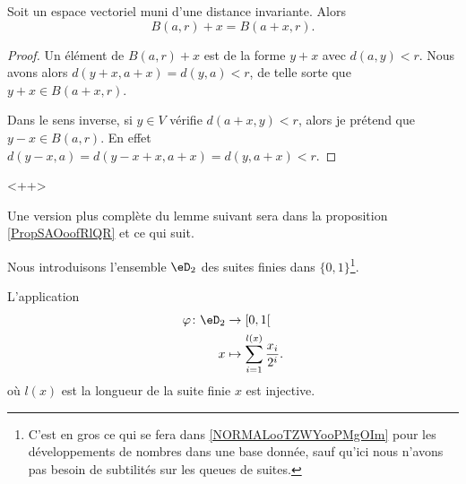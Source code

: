 \begin{lemma}        \label{LEMooZNBAooOhEwJd}
	Soit un espace vectoriel muni d'une distance invariante. Alors
	\begin{equation}
		B(a,r)+x=B(a+x,r).
	\end{equation}
\end{lemma}

\begin{proof}
	Un élément de \( B(a,r)+x\) est de la forme \( y+x\) avec \( d(a,y)<r\). Nous avons alors \( d(y+x,a+x)=d(y,a)<r\), de telle sorte que \( y+x\in B(a+x,r)\).

	Dans le sens inverse, si \( y\in V\) vérifie \( d(a+x,y)<r\), alors je prétend que \( y-x\in B(a,r)\). En effet \( d(y-x,a)=d(y-x+x,a+x)=d(y,a+x)<r\).
\end{proof}
<++>

Une version plus complète du lemme suivant sera dans la proposition \ref{PropSAOoofRlQR} et ce qui suit.
\begin{lemma}      \label{LEMooIQBXooUEtdoy}
	Nous introduisons l'ensemble \( \eD_2\) des suites finies dans \( \{ 0,1 \}\)\footnote{C'est en gros ce qui se fera dans \ref{NORMALooTZWYooPMgOIm} pour les développements de nombres dans une base donnée, sauf qu'ici nous n'avons pas besoin de subtilités sur les queues de suites.}.

	L'application
	\begin{equation}
		\begin{aligned}
			\varphi\colon \eD_2 & \to \mathopen[ 0 , 1 \mathclose[              \\
			x                   & \mapsto \sum_{i=1}^{l(x)}\frac{ x_i }{ 2^i }.
		\end{aligned}
	\end{equation}
	où \( l(x)\) est la longueur de la suite finie \( x\) est injective.
\end{lemma}

